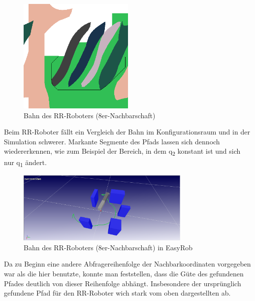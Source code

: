 \documentclass[11pt, a4paper]{article}
\begin{document}
\begin{figure}[H]
	\center\includegraphics[width=0.5\textwidth,frame]{../Termin6/Termin6/cspace_revolute_bfs.png}
	\caption{Bahn des RR-Roboters (8er-Nachbarschaft)}
\end{figure}

Beim RR-Roboter fällt ein Vergleich der Bahn im Konfigurationsraum und in der Simulation schwerer. 
Markante Segmente des Pfads lassen sich dennoch wiedererkennen, wie zum Beispiel der Bereich, in dem q\textsubscript{2} konstant ist und sich nur q\textsubscript{1} ändert.

\begin{figure}[H]
	\center\includegraphics[width=0.75\textwidth]{revolute.png}
	\caption{Bahn des RR-Roboters (8er-Nachbarschaft) in EasyRob}
\end{figure}

Da zu Beginn eine andere Abfragereihenfolge der Nachbarkoordinaten vorgegeben war als die hier benutzte, konnte man feststellen, dass die Güte des gefundenen Pfades deutlich von dieser Reihenfolge abhängt. Insbesondere der ursprünglich gefundene Pfad für den RR-Roboter wich stark vom oben dargestellten ab.
\end{document}
